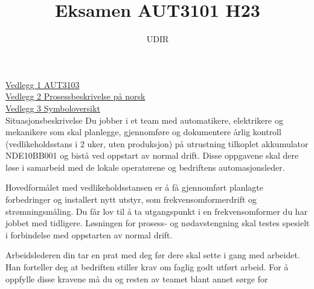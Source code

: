 \documentclass[12pt,a4paper]{article}
\begin{document}
\title{Eksamen AUT3101 H23}
\author{UDIR}
\maketitle
\href{https://sokeresultat.udir.no/eksamenprovemateriell.html?kategori=aut3103&aar=2023-6&spraak=bokm%C3%A5l&trinn=annet&ferdighet=annet}{Vedlegg 1 AUT3103}\\
\href{https://sokeresultat.udir.no/eksamenprovemateriell.html?kategori=aut3103&aar=2023-3&spraak=bokm%C3%A5l&trinn=annet&ferdighet=annet}{Vedlegg 2 Prosessbeskrivelse på norsk}\\
\href{https://sokeresultat.udir.no/eksamenprovemateriell.html?kategori=aut3103&aar=2023-4&spraak=bokm%C3%A5l&trinn=annet&ferdighet=annet}{Vedlegg 3 Symboloversikt}\\
\vskip 1cm
Situasjonsbeskrivelse
\vskip  0.25cm
Du jobber i et team med automatikere, elektrikere og mekanikere som skal planlegge, gjennomføre og dokumentere årlig kontroll (vedlikeholdsstans i 2 uker, uten produksjon) på utrustning tilkoplet akkumulator NDE10BB001 og bistå ved oppstart av normal drift. Disse oppgavene skal dere løse i samarbeid med de lokale operatørene og bedriftens automasjonsleder.  

\vskip 0.25cm
Hovedformålet med vedlikeholdsstansen er å få gjennomført planlagte forbedringer og installert nytt utstyr, som frekvensomformerdrift og strømningsmåling. Du får lov til å ta utgangspunkt i en frekvensomformer du har jobbet med tidligere. Løsningen for prosess- og nødavstengning skal testes spesielt i forbindelse med oppstarten av normal drift.  

\vskip 0.25cm
Arbeidslederen din tar en prat med deg før dere skal sette i gang med arbeidet. Han forteller deg at bedriften stiller krav om faglig godt utført arbeid. For å oppfylle disse kravene må du og resten av teamet blant annet sørge for  
\end{document}
